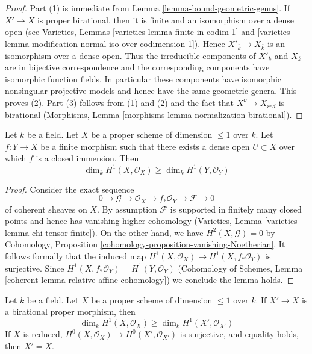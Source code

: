 \begin{proof}
Part (1) is immediate from Lemma \ref{lemma-bound-geometric-genus}.
If $X' \to X$ is proper birational, then it is finite and
an isomorphism over a dense open (see
Varieties, Lemmas \ref{varieties-lemma-finite-in-codim-1} and
\ref{varieties-lemma-modification-normal-iso-over-codimension-1}).
Hence $X'_{\overline{k}} \to X_{\overline{k}}$ is an isomorphism
over a dense open. Thus the irreducible components of $X'_{\overline{k}}$
and $X_{\overline{k}}$ are in bijective correspondence and the
corresponding components have isomorphic function fields.
In particular these components have isomorphic nonsingular projective models
and hence have the same geometric genera.
This proves (2).
Part (3) follows from (1) and (2) and the fact that
$X^\nu \to X_{red}$ is birational
(Morphisms, Lemma \ref{morphisms-lemma-normalization-birational}).
\end{proof}

\begin{lemma}
\label{lemma-genus-goes-down}
Let $k$ be a field. Let $X$ be a proper scheme of dimension
$\leq 1$ over $k$. Let $f : Y \to X$ be a finite morphism
such that there exists a dense open $U \subset X$ over
which $f$ is a closed immersion. Then
$$
\dim_k H^1(X, \mathcal{O}_X) \geq \dim_k H^1(Y, \mathcal{O}_Y)
$$
\end{lemma}

\begin{proof}
Consider the exact sequence
$$
0 \to \mathcal{G} \to \mathcal{O}_X \to f_*\mathcal{O}_Y \to \mathcal{F} \to 0
$$
of coherent sheaves on $X$.
By assumption $\mathcal{F}$ is supported in finitely many closed points
and hence has vanishing higher cohomology
(Varieties, Lemma \ref{varieties-lemma-chi-tensor-finite}).
On the other hand, we have $H^2(X, \mathcal{G}) = 0$ by
Cohomology, Proposition \ref{cohomology-proposition-vanishing-Noetherian}.
It follows formally that the induced map
$H^1(X, \mathcal{O}_X) \to H^1(X, f_*\mathcal{O}_Y)$
is surjective. Since $H^1(X, f_*\mathcal{O}_Y) = H^1(Y, \mathcal{O}_Y)$
(Cohomology of Schemes, Lemma \ref{coherent-lemma-relative-affine-cohomology})
we conclude the lemma holds.
\end{proof}

\begin{lemma}
\label{lemma-genus-normalization}
Let $k$ be a field. Let $X$ be a proper scheme of dimension $\leq 1$ over $k$.
If $X' \to X$ is a birational proper morphism, then
$$
\dim_k H^1(X, \mathcal{O}_X) \geq \dim_k H^1(X', \mathcal{O}_{X'})
$$
If $X$ is reduced, $H^0(X, \mathcal{O}_X) \to H^0(X', \mathcal{O}_{X'})$
is surjective, and equality holds, then $X' = X$.
\end{lemma}

